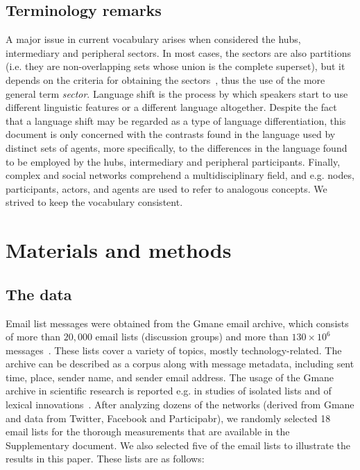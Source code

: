 \documentclass[review]{elsarticle}
\begin{document}
\subsection{Terminology remarks}
A major issue in current vocabulary arises when considered the hubs, intermediary and peripheral sectors.
In most cases, the sectors are also partitions
(i.e. they are non-overlapping sets whose union is the complete superset),
but it depends on the criteria for obtaining the sectors~\cite{stab},
thus the use of the more general term \emph{sector}.
Language shift is the process by which speakers start to use different linguistic features or a different language altogether.
Despite the fact that a language shift may be regarded as a type of language differentiation, this document
is only concerned with the contrasts found in the language used by distinct sets of agents,
more specifically, to the differences in the language found to be employed by the hubs, intermediary and peripheral participants.
Finally, complex and social networks comprehend a multidisciplinary field,
and e.g. nodes, participants, actors, and agents are used to refer to analogous concepts.
We strived to keep the vocabulary consistent.

\section{Materials and methods}\label{smm}
\subsection{The data}
Email list messages were obtained from
the Gmane email archive, which consists of more than $20,000$
email lists (discussion groups) and more than $130\times 10^6$ messages~\cite{GMANEwikipedia}.
These lists cover a variety of topics, mostly technology-related.
The archive can be described as a corpus along with message metadata,
including sent time, place, sender name, and sender email address.
The usage of the Gmane archive in scientific research is
reported e.g. in studies of isolated lists and of lexical innovations~\cite{Gmane2,bird}. 
After analyzing dozens of the networks
(derived from Gmane and data from Twitter, Facebook and Participabr),
we randomly selected 18 email lists for the thorough measurements that are available in the Supplementary document.
We also selected five of the email lists
to illustrate the results in this paper.
These lists are as follows:
\end{document}
